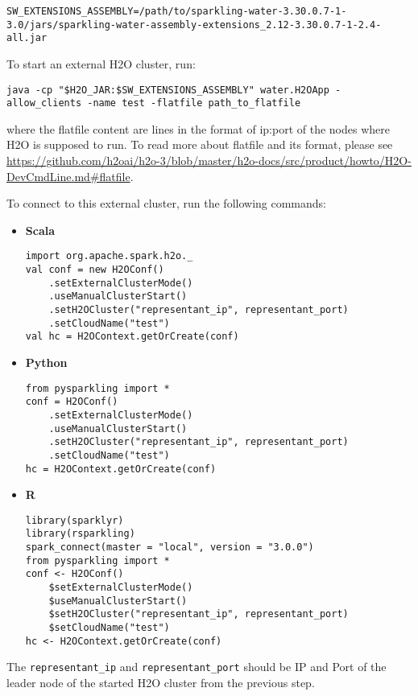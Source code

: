 \begin{lstlisting}[style=bash]
SW_EXTENSIONS_ASSEMBLY=/path/to/sparkling-water-3.30.0.7-1-3.0/jars/sparkling-water-assembly-extensions_2.12-3.30.0.7-1-2.4-all.jar
\end{lstlisting}

To start an external H2O cluster, run:

\begin{lstlisting}[style=bash]
java -cp "$H2O_JAR:$SW_EXTENSIONS_ASSEMBLY" water.H2OApp -allow_clients -name test -flatfile path_to_flatfile
\end{lstlisting}


where the flatfile content are lines in the format of ip:port of the nodes where H2O is supposed to run. To
read more about flatfile and its format, please
see \url{https://github.com/h2oai/h2o-3/blob/master/h2o-docs/src/product/howto/H2O-DevCmdLine.md#flatfile}.


To connect to this external cluster, run the following commands:

\begin{itemize}
    \item \textbf{Scala} \begin{lstlisting}[style=Scala]
import org.apache.spark.h2o._
val conf = new H2OConf()
    .setExternalClusterMode()
    .useManualClusterStart()
    .setH2OCluster("representant_ip", representant_port)
    .setCloudName("test")
val hc = H2OContext.getOrCreate(conf)
    \end{lstlisting}
    \item \textbf{Python} \begin{lstlisting}[style=Python]
from pysparkling import *
conf = H2OConf()
    .setExternalClusterMode()
    .useManualClusterStart()
    .setH2OCluster("representant_ip", representant_port)
    .setCloudName("test")
hc = H2OContext.getOrCreate(conf)
    \end{lstlisting}
    \item \textbf{R} \begin{lstlisting}[style=R]
library(sparklyr)
library(rsparkling)
spark_connect(master = "local", version = "3.0.0")
from pysparkling import *
conf <- H2OConf()
    $setExternalClusterMode()
    $useManualClusterStart()
    $setH2OCluster("representant_ip", representant_port)
    $setCloudName("test")
hc <- H2OContext.getOrCreate(conf)
    \end{lstlisting}
\end{itemize}

The \texttt{representant\_ip} and \texttt{representant\_port} should be IP and Port of the leader node of the started
H2O cluster from the previous step.


